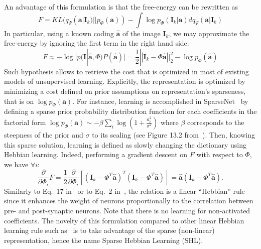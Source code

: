 \documentclass[a4paper, 11pt, draft]{article} %
\newcommand{\coef}{\mathbf{a}} %
\newcommand{\image}{\mathbf{I}} %
\newcommand{\dico}{\Phi} %
\newcommand{\norm}[1]{|\!| #1 |\!|}
\begin{document}
An advantage of this formulation is that the free-energy can be rewritten as
\begin{equation} F = KL( q_\Psi(\coef | \image_k) || p_\dico(\coef) ) - \int \log p_\dico(\image_k | \coef ) dq_\Psi(\coef | \image_k) \end{equation}
In particular, using a known coding $\hat{\coef}$ of the image $\image_k$, we may approximate the free-energy by ignoring the first term in the right hand side:
\begin{equation} F \approx - \log [ p(\image | \hat{\coef}, \dico ) P(\hat{\coef}) ] = \frac{1}{2} \norm{\image_k - \dico \hat{\coef}}_2^2 - \log p_\dico(\hat{\coef}) \label{eq:sparse_cost} \end{equation}
Such hypothesis allows to retrieve the cost that is optimized in most of existing models of unsupervised learning. Explicitly, the representation is optimized by minimizing a cost defined on prior assumptions on representation's sparseness, that is on $\log p_\dico( \coef )$. For instance, learning is accomplished in {\sc SparseNet}~\citep{Olshausen97} by defining a sparse prior probability distribution function for each coefficients in the factorial form $\log p_\dico(\coef) \sim -\beta \sum_i \log ( 1 + \frac{a_i^2}{\sigma^2} )$ where $\beta$ corresponds to the steepness of the prior and $\sigma$ to its scaling (see Figure 13.2 from~\citep{Olshausen02}). Then, knowing this sparse solution, learning is defined as slowly changing the dictionary using Hebbian learning.
Indeed, performing a gradient descent on $F$ with respect to $\dico$, we have $\forall i$:
$$ \frac{\partial }{\partial \dico_i } F = \frac{1}{2} \frac{\partial }{\partial \dico_i }[(\image_k - \dico^T \hat{\coef})^T (\image_k - \dico^T \hat{\coef})] = \hat{\coef} (\image_k - \dico^T \hat{\coef}).$$
Similarly to Eq.~17 in~\citep{Olshausen97} or to Eq.~2 in~\citep{Smith06}, the relation is a linear ``Hebbian'' rule~\citep{Hebb49} since it enhances the weight of neurons proportionally to the correlation between pre- and post-synaptic neurons. Note that there is no learning for non-activated coefficients. The novelty of this formulation compared to other linear Hebbian learning rule such as~\citep{Oja82} is to take advantage of the sparse (non-linear) representation, hence the name Sparse Hebbian Learning (SHL).
\end{document}
